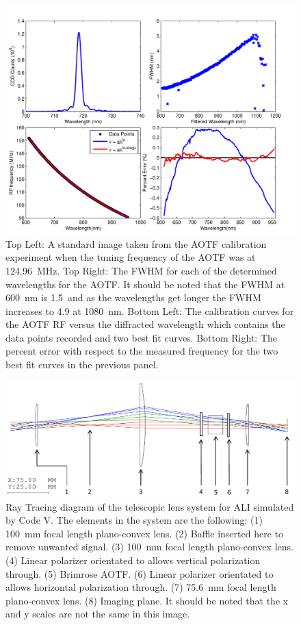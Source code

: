\documentclass[12pt]{article}
\begin{document}
\begin{figure}
    \includegraphics[width=1.0\textwidth]{./Images/3-1-AOTFCharaterization.pdf}
    \caption{Top Left: A standard image taken from the AOTF calibration experiment when the tuning frequency of the AOTF was at 124.96~MHz. Top Right: The FWHM for each of the determined wavelengths for the AOTF. It should be noted that the FWHM at 600~nm is 1.5~and as the wavelengths get longer the FWHM increases to 4.9 at 1080~nm. Bottom Left: The calibration curves for the AOTF RF versus the  diffracted wavelength which contains the data points recorded and two best fit curves. Bottom Right: The percent error with respect to the measured frequency for the two best fit curves in the previous panel.}
    \label{fig:3.1:AOTFCharaterization}
\end{figure}

\begin{figure}
    \includegraphics[width=1.0\textwidth]{./Images/3-2-TelescopicRayTracing.pdf}
    \caption{Ray Tracing diagram of the telescopic lens system for ALI simulated by Code V. The elements in the system are the following: (1) 100~mm focal length plano-convex lens. (2) Baffle inserted here to remove unwanted signal. (3) 100~mm focal length plano-convex lens. (4) Linear polarizer orientated to allows vertical polarization through. (5) Brimrose AOTF. (6) Linear polarizer orientated to allows horizontal polarization through. (7) 75.6~mm focal length plano-convex lens. (8) Imaging plane. It should be noted that the x and y scales are not the same in this image.}
    \label{fig:3.2:telescopicRayTracing}
\end{figure}
\end{document}
